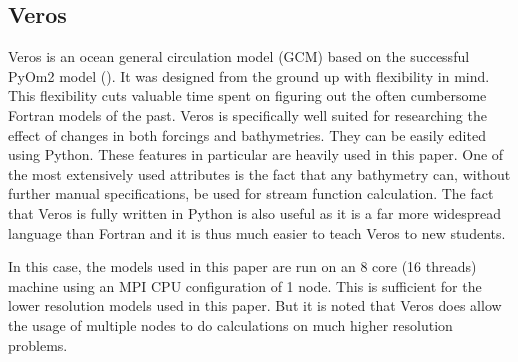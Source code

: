 \subsection{Veros}
Veros is an ocean general circulation model (GCM) based on the successful PyOm2 model (\cite{Hafner2018Aug}). It was designed from the ground up with flexibility in mind. This flexibility cuts valuable time spent on figuring out the often cumbersome Fortran models of the past. Veros is specifically well suited for researching the effect of changes in both forcings and bathymetries. They can be easily edited using Python. These features in particular are heavily used in this paper. One of the most extensively used attributes is the fact that any bathymetry can, without further manual specifications, be used for stream function calculation.
The fact that Veros is fully written in Python is also useful as it is a far more widespread language than Fortran and it is thus much easier to teach Veros to new students. 

In this case, the models used in this paper are run on an 8 core (16 threads) machine using an MPI CPU configuration of 1 node. This is sufficient for the lower resolution models used in this paper. But it is noted that Veros does allow the usage of multiple nodes to do calculations on much higher resolution problems.

